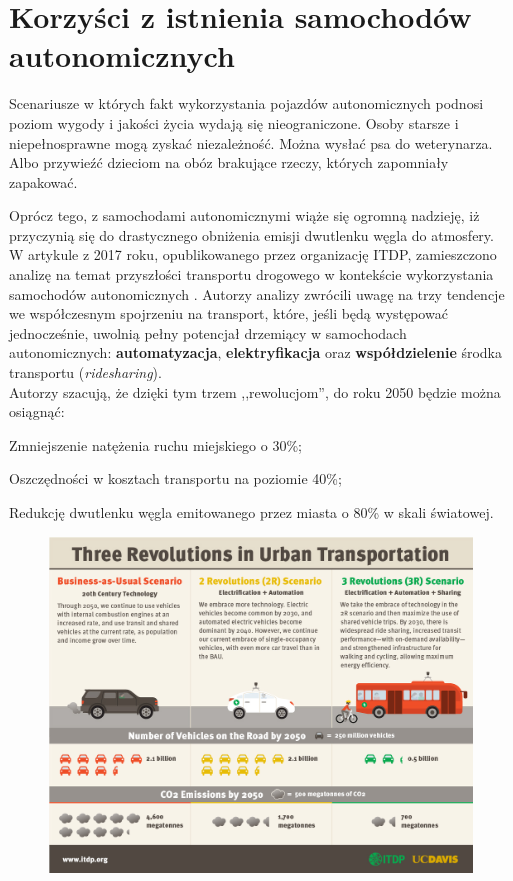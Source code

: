 \section{Korzyści z istnienia samochodów autonomicznych}
Scenariusze w których fakt wykorzystania pojazdów autonomicznych podnosi poziom wygody i jakości życia wydają się nieograniczone. Osoby starsze i niepełnosprawne mogą zyskać niezależność. Można wysłać psa do weterynarza. Albo przywieźć dzieciom na obóz brakujące rzeczy, których zapomniały zapakować.

Oprócz tego, z samochodami autonomicznymi wiąże się ogromną nadzieję, iż przyczynią się do drastycznego obniżenia emisji dwutlenku węgla do atmosfery. W artykule z 2017 roku, opublikowanego przez organizację ITDP, zamieszczono analizę na temat przyszłości transportu drogowego w kontekście wykorzystania samochodów autonomicznych \cite{itdp:urbanTransportRevolutions}. Autorzy analizy zwrócili uwagę na trzy tendencje we współczesnym spojrzeniu na transport, które, jeśli będą występować jednocześnie, uwolnią pełny potencjał drzemiący w samochodach autonomicznych: \textbf{automatyzacja}, \textbf{elektryfikacja} oraz \textbf{współdzielenie} środka transportu (\textit{ridesharing}). \\
Autorzy szacują, że dzięki tym trzem ,,rewolucjom'', do roku 2050 będzie można osiągnąć:
\begin{enumerate*}
\item Zmniejszenie natężenia ruchu miejskiego o 30\%;
\item Oszczędności w kosztach transportu na poziomie 40\%;
\item Redukcję dwutlenku węgla emitowanego przez miasta o 80\% w skali światowej.
\end{enumerate*}

\begin{figure}[H]
\centering
\includegraphics[width=15cm]{resources/figures/itdp_infographic.jpg}
\end{figure}

